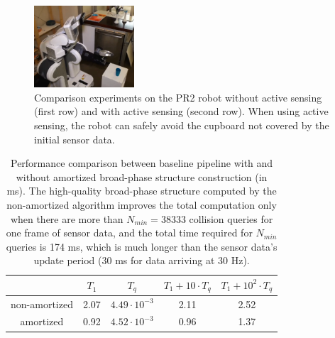 \begin{figure}[t]
  \includegraphics[height=1.2in]{figs/8/succ4.png}
  \caption[Comparison experiments on the PR2 robot without and with active sensing]{\label{fig:8:actualPR2} Comparison experiments on the PR2 robot without active sensing (first row) and with active sensing (second row). When using active sensing, the robot can safely avoid the cupboard not covered by the initial sensor data.}
\end{figure}


\begin{table}[htbp]
\centering
\begin{tabular}{c|c c | c c}
 & $T_1$ & $T_q$ & $T_1 + 10 \cdot T_q$ & $T_1 + 10^2 \cdot T_q$ \\\hline
non-amortized & 2.07 & $4.49\cdot 10^{-3}$ & 2.11 & 2.52 \\
amortized & 0.92 & $4.52 \cdot 10^{-3}$ & 0.96 & 1.37 \\
\end{tabular}
\caption[Performance comparison between pipelines with and without amortized broad-phase structure construction]{Performance comparison between baseline pipeline with and without amortized broad-phase structure construction (in ms). The high-quality broad-phase structure computed by the non-amortized algorithm improves the total computation only when there are more than $N_{min} = 38333$ collision queries for one frame of sensor data, and the total time required for $N_{min}$ queries is 174 ms, which is much longer than the sensor data's update period ($30$ ms for data arriving at 30 Hz).
\label{table:8:amortized}
}
\end{table}


